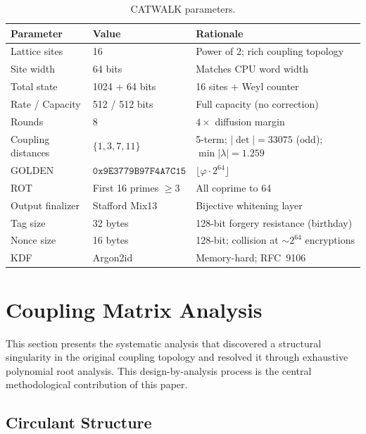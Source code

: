 \documentclass[runningheads]{llncs}
\newcommand{\GOLDEN}{\texttt{0x9E3779B97F4A7C15}}
\begin{document}
\begin{table}[h]
\centering
\caption{CATWALK parameters.}
\label{tab:params}
\begin{tabular}{@{}lll@{}}
\toprule
Parameter & Value & Rationale \\
\midrule
Lattice sites & 16 & Power of 2; rich coupling topology \\
Site width & 64 bits & Matches CPU word width \\
Total state & 1024 + 64 bits & 16 sites + Weyl counter \\
Rate / Capacity & 512 / 512 bits & Full capacity (no correction) \\
Rounds & 8 & $4\times$ diffusion margin \\
Coupling distances & $\{1,3,7,11\}$ & 5-term; $|\det|=33075$ (odd); $\min|\lambda|=1.259$ \\
GOLDEN & $\GOLDEN$ & $\lfloor \varphi \cdot 2^{64} \rfloor$ \\
ROT & First 16 primes $\geq 3$ & All coprime to 64 \\
Output finalizer & Stafford Mix13 & Bijective whitening layer \\
Tag size & 32 bytes & 128-bit forgery resistance (birthday) \\
Nonce size & 16 bytes & 128-bit; collision at $\sim\!2^{64}$ encryptions \\
KDF & Argon2id & Memory-hard; RFC~9106 \\
\bottomrule
\end{tabular}
\end{table}

\section{Coupling Matrix Analysis}
\label{sec:coupling}

This section presents the systematic analysis that discovered a structural
singularity in the original coupling topology and resolved it through
exhaustive polynomial root analysis.  This design-by-analysis process is the
central methodological contribution of this paper.

\subsection{Circulant Structure}
\end{document}
